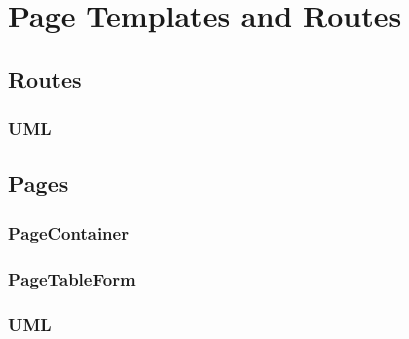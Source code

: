 \documentclass[../react.tex]{subfiles}
\begin{document}
	
	\section{Page Templates and Routes}

	\subsection{Routes}
	
		\subsubsection{UML}
		
	\subsection{Pages}
	

	\subsubsection{PageContainer}
	
	\subsubsection{PageTableForm}
	
	\subsubsection{UML}
	
\end{document}
